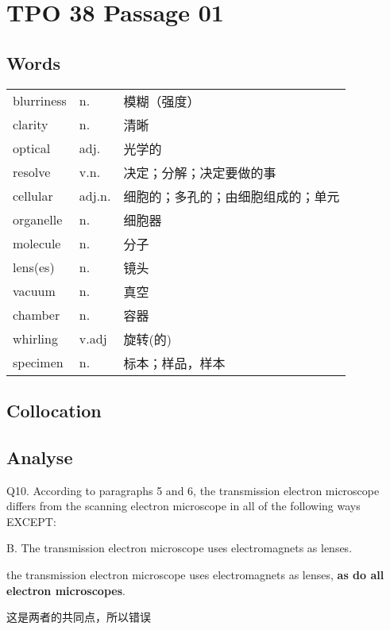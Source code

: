 \section{TPO 38 Passage 01}

\subsection{Words}

\begin{tabular}{lll}
    blurriness & n.     & 模糊（强度）            \\
    clarity    & n.     & 清晰                \\
    optical    & adj.   & 光学的               \\
    resolve    & v.n.   & 决定；分解；决定要做的事      \\
    cellular   & adj.n. & 细胞的；多孔的；由细胞组成的；单元 \\
    organelle  & n.     & 细胞器               \\
    molecule   & n.     & 分子                \\
    lens(es)   & n.     & 镜头                \\
    vacuum     & n.     & 真空                \\
    chamber    & n.     & 容器                \\
    whirling   & v.adj  & 旋转(的)             \\
    specimen   & n.     & 标本；样品，样本          \\
\end{tabular}

\subsection{Collocation}


\subsection{Analyse}

\begin{blk}
    \begin{qst}
        Q10. According to paragraphs 5 and 6, the transmission electron microscope differs from the scanning electron microscope in all of the following ways EXCEPT:
    \end{qst}

    \begin{chc}
        B. The transmission electron microscope uses electromagnets as lenses.
    \end{chc}

    \begin{psgq}
        the transmission electron microscope uses electromagnets as lenses, \textbf{as do all electron microscopes}.
    \end{psgq}

    \begin{nlz}
        这是两者的共同点，所以错误
    \end{nlz}
\end{blk}

